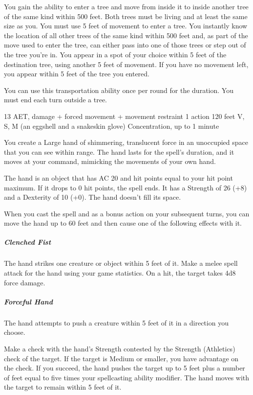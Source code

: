 You gain the ability to enter a tree and move from inside it to inside another tree of the same kind within 500 feet. Both trees must be living and at least the same size as you. You must use 5 feet of movement to enter a tree. You instantly know the location of all other trees of the same kind within 500 feet and, as part of the move used to enter the tree, can either pass into one of those trees or step out of the tree you're in. You appear in a spot of your choice within 5 feet of the destination tree, using another 5 feet of movement. If you have no movement left, you appear within 5 feet of the tree you entered.

You can use this transportation ability once per round for the duration. You must end each turn outside a tree.

\label{spell:arcane-hand}
{13 AET, damage + forced movement + movement restraint}
{1 action}
{120 feet}
{V, S, M (an eggshell and a snakeskin glove)}
{Concentration, up to 1 minute}

You create a Large hand of shimmering, translucent force in an unoccupied space that you can see within range. The hand lasts for the spell's duration, and it moves at your command, mimicking the movements of your own hand.

The hand is an object that has AC 20 and hit points equal to your hit point maximum. If it drops to 0 hit points, the spell ends. It has a Strength of 26 (+8) and a Dexterity of 10 (+0). The hand doesn't fill its space.

When you cast the spell and as a bonus action on your subsequent turns, you can move the hand up to 60 feet and then cause one of the following effects with it.

\subparagraph*{Clenched Fist} The hand strikes one creature or object within 5 feet of it. Make a melee spell attack for the hand using your game statistics. On a hit, the target takes 4d8 force damage.

\subparagraph*{Forceful Hand} The hand attempts to push a creature within 5 feet of it in a direction you choose.

Make a check with the hand's Strength contested by the Strength (Athletics) check of the target. If the target is Medium or smaller, you have advantage on the check. If you succeed, the hand pushes the target up to 5 feet plus a number of feet equal to five times your spellcasting ability modifier. The hand moves with the target to remain within 5 feet of it.

